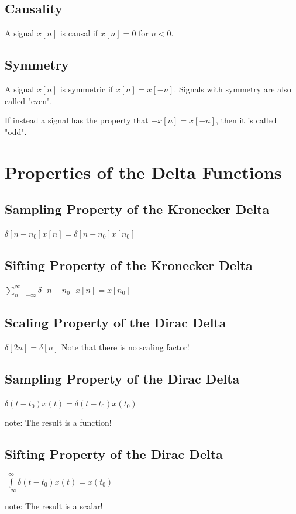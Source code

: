 \documentclass[11pt]{article}
\begin{document}
\subsection{Causality}
A signal $x[n]$ is causal if $x[n]=0$ for $n<0$.

\subsection{Symmetry}
A signal $x[n]$ is symmetric if $x[n] = x[-n]$. Signals with symmetry are also called "even".

If instead a signal has the property that $-x[n] = x[-n]$, then it is called "odd".

\section{Properties of the Delta Functions}

\subsection{Sampling Property of the Kronecker Delta}
$\delta[n-n_0]x[n] = \delta[n-n_0]x[n_0]$

\subsection{Sifting Property of the Kronecker Delta}
$\sum\limits_{n=-\infty}^\infty \delta[n-n_0]x[n] = x[n_0]$

\subsection{Scaling Property of the Dirac Delta}
$\delta[2n]=\delta[n]$ Note that there is no scaling factor!

\subsection{Sampling Property of the Dirac Delta}
$\delta(t-t_0)x(t) = \delta(t-t_0)x(t_0)$

note: The result is a function!

\subsection{Sifting Property of the Dirac Delta}
$\int\limits_{-\infty}^\infty \delta(t-t_0)x(t) = x(t_0)$

note: The result is a scalar!
\end{document}
